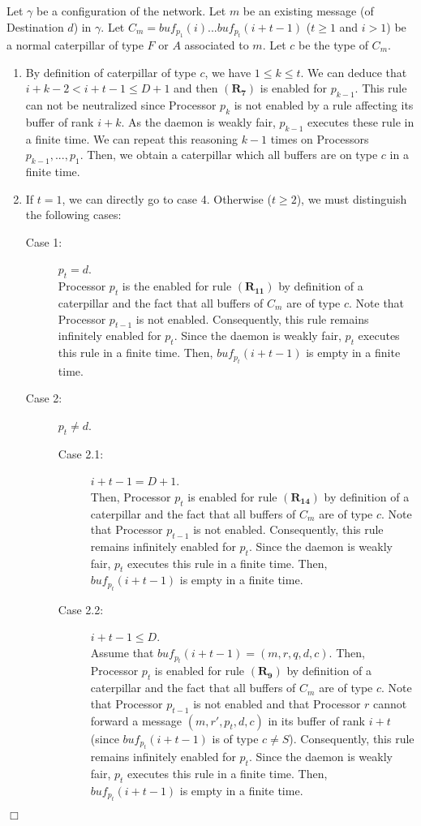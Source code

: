 \documentclass[11pt]{article}
\newenvironment{proof}{{\noindent\bf Proof. } }{{\hfill $\Box$}}
\begin{document}
\begin{proof}
Let $\gamma$ be a configuration of the network. Let $m$ be an existing message (of Destination $d$) in $\gamma$. Let $C_{m}=buf_{p_{1}}(i)...buf_{p_{t}}(i+t-1)$ ($t\geq1$ and $i>1$) be a normal caterpillar of type $F$ or $A$  associated to $m$. Let $c$ be the type of $C_{m}$.

\begin{enumerate}
\item By definition of caterpillar of type $c$, we have $1\leq k\leq t$. We can deduce that $i+k-2<i+t-1\leq D+1$ and then $\boldsymbol{(R_{7})}$ is enabled for $p_{k-1}$. This rule can not be neutralized since Processor $p_{k}$ is not enabled by a rule affecting its buffer of rank $i+k$. As the daemon is weakly fair, $p_{k-1}$ executes these rule in a finite time. We can repeat this reasoning $k-1$ times on Processors $p_{k-1},...,p_{1}$. Then, we obtain a caterpillar which all buffers are on type $c$ in a finite time.
\item If $t=1$, we can directly go to case 4. Otherwise ($t\geq2$), we must distinguish the following cases:

\begin{description}
\item [Case 1:] $p_{t}=d$.\\
Processor $p_{t}$ is the enabled for rule $\boldsymbol{(R_{11})}$ by definition of a caterpillar and the fact that all buffers of $C_{m}$ are of type $c$. Note that Processor $p_{t-1}$ is not enabled. Consequently, this rule remains infinitely enabled for $p_{t}$. Since the daemon is weakly fair, $p_{t}$ executes this rule in a finite time. Then, $buf_{p_{t}}(i+t-1)$ is empty in a finite time.
\item [Case 2:] $p_{t}\neq d$.\\

\begin{description}
\item [Case 2.1:] $i+t-1=D+1$.\\
Then, Processor $p_{t}$ is enabled for rule $\boldsymbol{(R_{14})}$ by definition of a caterpillar and the fact that all buffers of $C_{m}$ are of type $c$. Note that Processor $p_{t-1}$ is not enabled. Consequently, this rule remains infinitely enabled for $p_{t}$. Since the daemon is weakly fair, $p_{t}$ executes this rule in a finite time. Then, $buf_{p_{t}}(i+t-1)$ is empty in a finite time.
\item [Case 2.2:] $i+t-1\leq D$.\\
Assume that $buf_{p_{t}}(i+t-1)=(m,r,q,d,c)$. Then, Processor $p_{t}$ is enabled for rule $\boldsymbol{(R_{9})}$ by definition of a caterpillar and the fact that all buffers of $C_{m}$ are of type $c$. Note that Processor $p_{t-1}$ is not enabled and that Processor $r$ cannot forward a message $(m,r',p_{t},d,c)$ in its buffer of rank $i+t$ (since $buf_{p_{t}}(i+t-1)$ is of type $c\neq S$). Consequently, this rule remains infinitely enabled for $p_{t}$. Since the daemon is weakly fair, $p_{t}$ executes this rule in a finite time. Then, $buf_{p_{t}}(i+t-1)$ is empty in a finite time.
\end{description}


\end{description}
\end{enumerate}
\end{proof}
\end{document}
